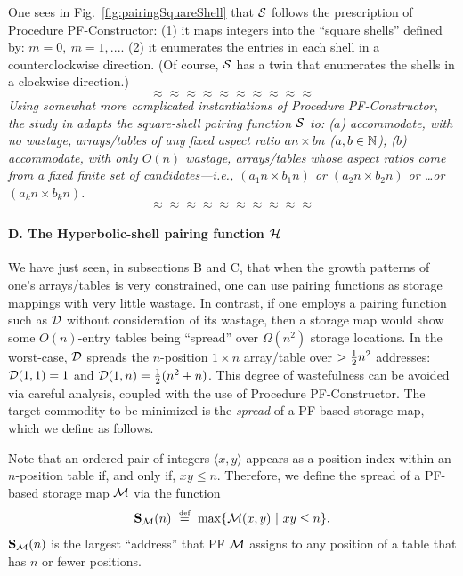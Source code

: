 One sees in Fig.~\ref{fig:pairingSquareShell} that $\mbox{$\cal S$}$ follows the
prescription of Procedure PF-Constructor: (1) it maps integers into
the ``square shells'' defined by: $m = 0, \ m = 1, ...$.  (2) it
enumerates the entries in each shell in a counterclockwise direction.
(Of course, $\mbox{$\cal S$}$ has a twin that enumerates the shells in a clockwise
direction.)
\[ \approx \approx \approx \approx \approx \approx \approx \approx \approx \approx \]
{\em Using somewhat more complicated instantiations of Procedure
  PF-Constructor, the study in \cite{Rosenberg75} adapts the
  square-shell pairing function $\mbox{$\cal S$}$ to: ($a$) accommodate, with no
  wastage, arrays/tables of any fixed aspect ratio $an \times bn$
  ($a,b \in \mathbb{N}$); ($b$) accommodate, with only $O(n)$ wastage,
  arrays/tables whose aspect ratios come from a fixed finite set of
  candidates---i.e., $(a_1 n \times b_1 n)$ or $(a_2 n \times b_2 n)$
  or \ldots or $(a_k n \times b_k n)$.}
\[ \approx \approx \approx \approx \approx \approx \approx \approx \approx \approx \]

\paragraph{\small\sf D. The Hyperbolic-shell pairing function $\mbox{$\cal H$}$}

We have just seen, in subsections B and C, that when the growth
patterns of one's arrays/tables is very constrained, one can use
pairing functions as storage mappings with very little wastage.  In
contrast, if one employs a pairing function such as $\mbox{$\cal D$}$ without
consideration of its wastage, then a storage map would show some
$O(n)$-entry tables being ``spread'' over $\Omega(n^2)$ storage
locations.  In the worst-case, $\mbox{$\cal D$}$ spreads the $n$-position $1 \times
n$ array/table over $> {1 \over 2} n^2$ addresses: $\mbox{$\cal D$}(1,1) = 1$ and
$\mbox{$\cal D$}(1,n) = {1 \over 2} (n^2 + n)$.  This degree of wastefulness can be
avoided via careful analysis, coupled with the use of Procedure
PF-Constructor.  The target commodity to be minimized is the {\it
  spread} of a PF-based storage map, which we define as follows.

Note that an ordered pair of integers $\langle x,y \rangle$ appears as
a position-index within an $n$-position table if, and only if, $xy
\leq n$.  Therefore, we define the spread of a PF-based storage map
$\mbox{$\cal M$}$ via the function
\begin{equation}
\label{e.compact}
{\bf S}_{\cal M}(n) \ \stackrel{\mbox{{\tiny def}}}{=} \ \max\{ \mbox{$\cal M$}(x, y) \ | \ xy \leq n \}.
\end{equation}
${\bf S}_{\cal M}(n)$ is the largest ``address'' that PF $\mbox{$\cal M$}$ assigns
to any position of a table that has $n$ or fewer positions.

